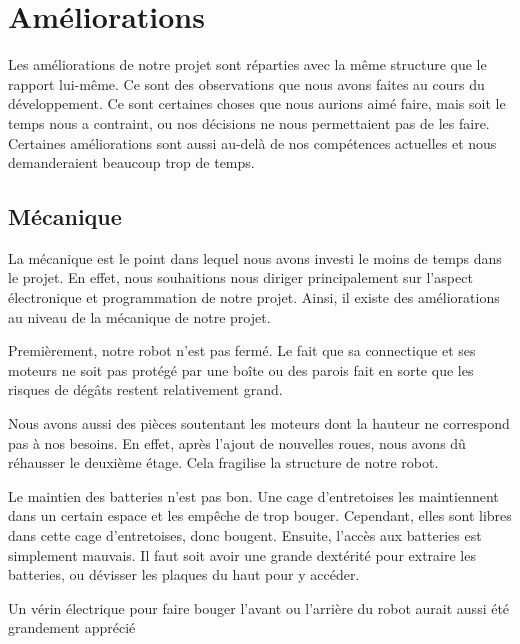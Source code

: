 \documentclass[
	a4paper,									%
	11pt,										%
	twoside,									%
	openright,									%
	notitlepage,									%
	parskip=half,								%
]{scrreprt}										%
\begin{document}
\chapter{Améliorations}

Les améliorations de notre projet sont réparties avec la même structure que le rapport lui-même. 
Ce sont des observations que nous avons faites au cours du développement. Ce sont certaines 
choses que nous aurions aimé faire, mais soit le temps nous a contraint, ou nos décisions 
ne nous permettaient pas de les faire. Certaines améliorations sont aussi au-delà de nos 
compétences actuelles et nous demanderaient beaucoup trop de temps. \par

\section{Mécanique}

La mécanique est le point dans lequel nous avons investi le moins de temps dans le projet. 
En effet, nous souhaitions nous diriger principalement sur l'aspect électronique et programmation
de notre projet. Ainsi, il existe des améliorations au niveau de la mécanique de notre projet. \par

Premièrement, notre robot n'est pas fermé. Le fait que sa connectique et ses moteurs ne soit 
pas protégé par une boîte ou des parois fait en sorte que les risques de dégâts restent 
relativement grand. \par

Nous avons aussi des pièces soutentant les moteurs dont la hauteur ne correspond pas à nos besoins. 
En effet, après l'ajout de nouvelles roues, nous avons dû réhausser le deuxième étage. Cela fragilise 
la structure de notre robot. \par

Le maintien des batteries n'est pas bon. Une cage d'entretoises les maintiennent dans un certain espace
et les empêche de trop bouger. Cependant, elles sont libres dans cette cage d'entretoises, donc bougent. 
Ensuite, l'accès aux batteries est simplement mauvais. Il faut soit avoir une grande dextérité pour 
extraire les batteries, ou dévisser les plaques du haut pour y accéder. \par

Un vérin électrique pour faire bouger l'avant ou l'arrière du robot aurait aussi été grandement 
apprécié \par
\end{document}
